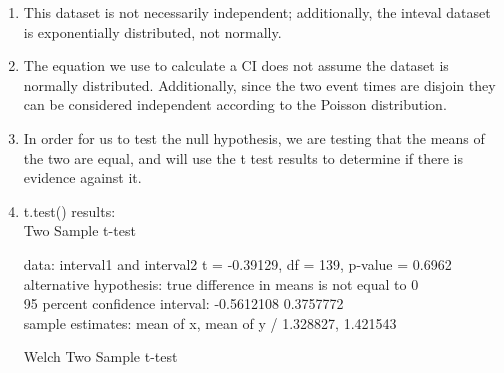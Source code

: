 \documentclass{article}
\begin{document}
\begin{enumerate}
\begin{multicols}{2}
\begin{tabular}{lr|}
                  interval2    & 1.421543
              \end{tabular}
              \\ \\
              Going by the given means, we can see that each interval is approximately the inverse of the \# of safety car deployments per half (i.e: interval \(\approx \frac{1}{\# of deployments}\)). This makes sense as the exponential distribution (time between deployments) is the distribution of the time between events, and the Poisson distribution (number of deployments within a timespan), are inversely related.
          \end{multicols}
    \item This dataset is not necessarily independent; additionally, the inteval dataset is exponentially distributed, not normally.
    \item The equation we use to calculate a CI does not assume the dataset is normally distributed. Additionally, since the two event times are disjoin they can be considered independent according to the Poisson distribution.
    \item In order for us to test the null hypothesis, we are testing that the means of the two are equal, and will use the t test results to determine if there is evidence against it.
    \item t.test() results:\\
          Two Sample t-test

          data:  interval1 and interval2
          t = -0.39129, df = 139, p-value = 0.6962 \\
          alternative hypothesis: true difference in means is not equal to 0 \\
          95 percent confidence interval:
          -0.5612108  0.3757772 \\
          sample estimates:
          mean of x, mean of y /
          1.328827, 1.421543


          Welch Two Sample t-test


\end{enumerate}
\end{document}
